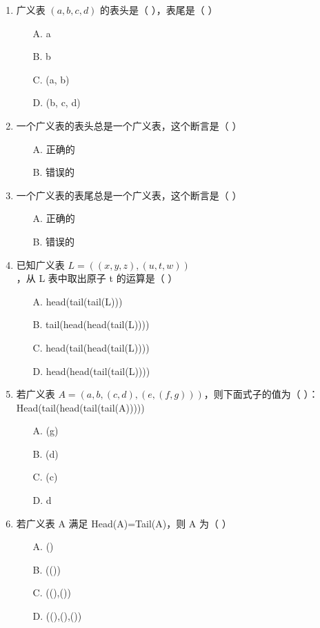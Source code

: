 \documentclass[12pt, a4paper]{article}
\begin{document}
\begin{enumerate}[label=\arabic*.]
	\item 广义表 $(a,b,c,d)$ 的表头是（ ），表尾是（ ）
	      \begin{enumerate}
		      \item[A.] a
		      \item[B.] b
		      \item[C.] (a, b)
		      \item[D.] (b, c, d)
	      \end{enumerate}

	\item 一个广义表的表头总是一个广义表，这个断言是（ ）
	      \begin{enumerate}
		      \item[A.] 正确的
		      \item[B.] 错误的
	      \end{enumerate}

	\item 一个广义表的表尾总是一个广义表，这个断言是（ ）
	      \begin{enumerate}
		      \item[A.] 正确的
		      \item[B.] 错误的
	      \end{enumerate}

	\item 已知广义表 $L=((x, y, z), (u, t, w))$，从 L 表中取出原子 t 的运算是（ ）
	      \begin{enumerate}
		      \item[A.] head(tail(tail(L)))
		      \item[B.] tail(head(head(tail(L))))
		      \item[C.] head(tail(head(tail(L))))
		      \item[D.] head(head(tail(tail(L))))
	      \end{enumerate}

	\item 若广义表 $A=(a,b,(c,d),(e,(f,g)))$，则下面式子的值为（ ）：Head(tail(head(tail(tail(A)))))
	      \begin{enumerate}
		      \item[A.] (g)
		      \item[B.] (d)
		      \item[C.] (c)
		      \item[D.] d
	      \end{enumerate}

	\item 若广义表 A 满足 Head(A)=Tail(A)，则 A 为（ ）
	      \begin{enumerate}
		      \item[A.] ()
		      \item[B.] (())
		      \item[C.] ((),())
		      \item[D.] ((),(),())
	      \end{enumerate}


\end{enumerate}
\end{document}
